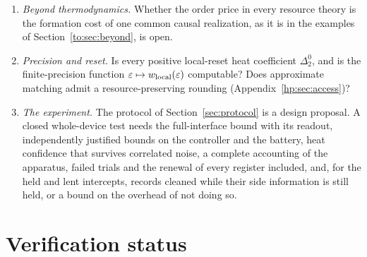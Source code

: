 \begin{enumerate}[leftmargin=*]
\item \emph{Beyond thermodynamics.} Whether the order price in every resource theory is the formation cost of one common causal realization, as it is in the examples of Section~\ref{to:sec:beyond}, is open.
\item \emph{Precision and reset.} Is every positive local-reset heat coefficient $\Delta^0_2$, and is the finite-precision function $\varepsilon\mapsto w_{\rm local}(\varepsilon)$ computable? Does approximate matching admit a resource-preserving rounding (Appendix~\ref{hp:sec:access})?
\item \emph{The experiment.} The protocol of Section~\ref{sec:protocol} is a design proposal. A closed whole-device test needs the full-interface bound with its readout, independently justified bounds on the controller and the battery, heat confidence that survives correlated noise, a complete accounting of the apparatus, failed trials and the renewal of every register included, and, for the held and lent intercepts, records cleaned while their side information is still held, or a bound on the overhead of not doing so.
\end{enumerate}

\section{Verification status}\label{sec:verification}

